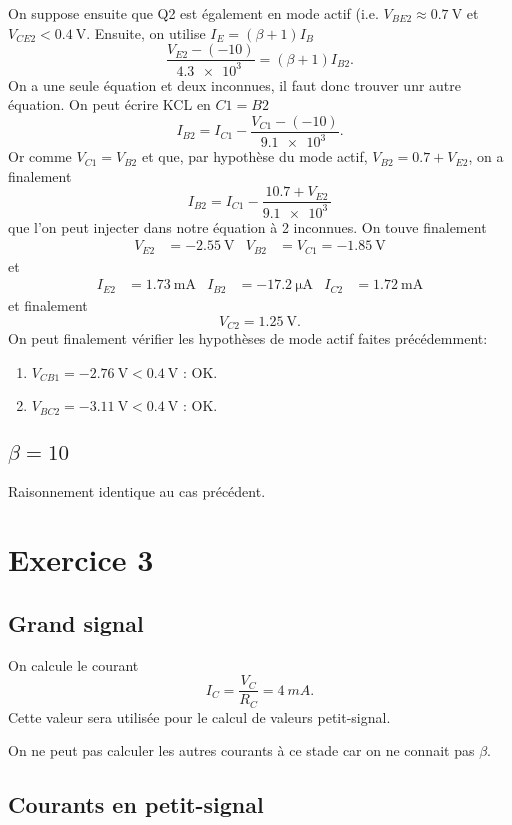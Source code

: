 \documentclass[frenchb,DIV=13]{scrartcl}
\begin{document}
On suppose ensuite que Q2 est également en mode actif (i.e. $V_{BE2} \approx \SI{0.7}{\volt}$
et $V_{CE2} < \SI{0.4}{\volt}$. Ensuite, on utilise $I_E = (\beta+1)I_B$
\[ \frac{V_{E2}-(-10)}{\SI{4.3e3}{}} = (\beta+1)I_{B2}. \]
On a une seule équation et deux inconnues, il faut donc trouver unr autre équation. On
peut écrire KCL en $C1 = B2$
\[ I_{B2} = I_{C1} - \frac{V_{C1}-(-10)}{\SI{9.1e3}{}}. \]
Or comme $V_{C1} = V_{B2}$ et que, par hypothèse du mode actif, $V_{B2} = 0.7 + V_{E2}$,
on a finalement
\[ I_{B2} = I_{C1} - \frac{10.7 + V_{E2}}{\SI{9.1e3}{}}\]
que l'on peut injecter dans notre équation à 2 inconnues.
On touve finalement
\begin{align*}
	V_{E2} &= -\SI{2.55}{\volt} & V_{B2} &= V_{C1} = -\SI{1.85}{\volt}
\end{align*}
et
\begin{align*}
	I_{E2} &= \SI{1.73}{\milli\ampere} & I_{B2} &= -\SI{17.2}{\micro\ampere} & I_{C2} &=
	\SI{1.72}{\milli\ampere}
\end{align*}
et finalement
\[ V_{C2} = \SI{1.25}{\volt}. \]
On peut finalement vérifier les hypothèses de mode actif faites précédemment:
\begin{enumerate}
	\item $V_{CB1} = -\SI{2.76}{\volt} < \SI{0.4}{\volt}$ : OK.
	\item $V_{BC2} = -\SI{3.11}{\volt} < \SI{0.4}{\volt}$ : OK.
\end{enumerate}
 
\subsection*{$\beta = 10$}
Raisonnement identique au cas précédent.

\section*{Exercice 3}

\subsection*{Grand signal}

On calcule le courant \[I_C = \frac{V_C}{R_C} = \SI{4}{mA}.\]
Cette valeur sera utilisée pour le calcul de valeurs petit-signal.

On ne peut pas calculer les autres courants à ce stade car on ne connait pas $\beta$.

\subsection*{Courants en petit-signal}
\end{document}
